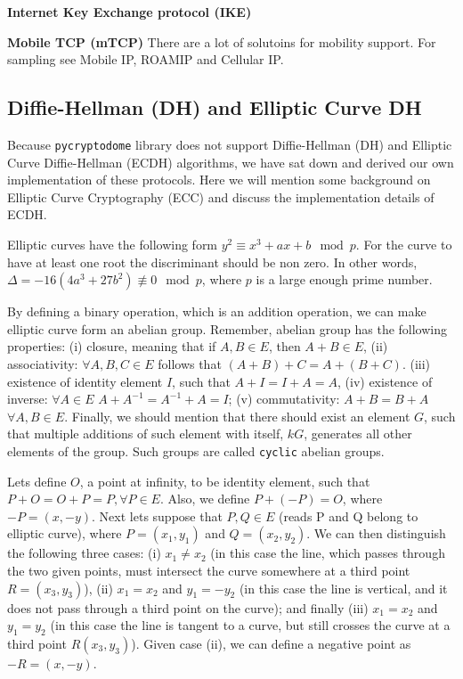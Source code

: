 {\bf Internet Key Exchange protocol (IKE)}

{\bf Mobile TCP (mTCP)} There are a lot of solutoins for mobility support. 
For sampling see Mobile IP, ROAMIP and Cellular IP.

\subsection{Diffie-Hellman (DH) and Elliptic Curve DH}

Because \texttt{pycryptodome} library does not support 
Diffie-Hellman (DH) and Elliptic Curve Diffie-Hellman (ECDH) algorithms,
we have sat down and derived our own implementation of these
protocols. Here we will mention some background on Elliptic Curve Cryptography (ECC)
and discuss the implementation details of ECDH.

Elliptic curves have the following form $y^2 \equiv x^3+ax+b \mod p$. For the 
curve to have at least one root the discriminant should be non 
zero. In other words, $\Delta = -16(4a^3+27b^2) \not\equiv 0 \mod p$,
where $p$ is a large enough prime number.

By defining a binary operation, which is an addition operation, we can make 
elliptic curve form an abelian group. Remember, abelian group has the following
properties: (i) closure, meaning that if $A, B \in E$, then $A+B\in E$,
(ii) associativity: $\forall A,B,C \in E$ follows that $(A+B)+C=A+(B+C)$.
(iii) existence of identity element $I$, such that $A+I=I+A=A$, (iv)
existence of inverse: $\forall A \in E$ $A+A^{-1}=A^{-1}+A=I$; (v)
commutativity: $A+B=B+A$ $\forall A, B\in E$. Finally, we should 
mention that there should exist an element $G$, such that multiple additions 
of such element with itself, $kG$, generates all other elements of the group. Such groups
are called \texttt{cyclic} abelian groups.

Lets define $O$, a point at infinity, to be identity element, such 
that $P+O = O + P = P, \forall P \in E$. Also, we define 
$P+(-P)=O$, where $-P=(x, -y)$. Next lets 
suppose that $P, Q \in E$ (reads P and Q belong to elliptic curve), 
where $P=(x_1, y_1)$ and $Q=(x_2, y_2)$. We 
can then distinguish the following three cases: (i) $x_1 \neq x_2$ (in this
case the line, which passes through the two given points, 
must intersect the curve somewhere at a third point $R = (x_3, y_3)$), 
(ii) $x_1 = x_2$ and $y_1=-y_2$ (in this case the line is vertical, and it does not
pass through a third point on the curve); and finally (iii) $x_1=x_2$ and $y_1=y_2$
(in this case the line is tangent to a curve, but still crosses the curve at a 
third point $R(x_3, y_3)$). Given case (ii), we can define a negative point 
as $-R = (x, -y)$.

